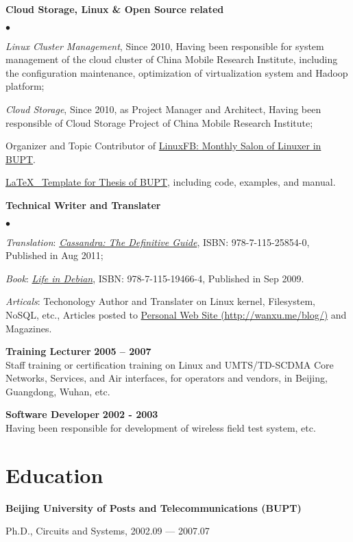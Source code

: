 \documentclass[a4paper,margin,line]{res}
\newenvironment{list1}{
  \begin{list}{\ding{113}}{%
      \setlength{\itemsep}{0in}
      \setlength{\parsep}{0in} \setlength{\parskip}{0in}
      \setlength{\topsep}{0in} \setlength{\partopsep}{0in} 
      \setlength{\leftmargin}{0.17in}}}{\end{list}}
\newenvironment{list2}{
  \begin{list}{$\bullet$}{%
      \setlength{\itemsep}{0in}
      \setlength{\parsep}{0in} \setlength{\parskip}{0in}
      \setlength{\topsep}{0in} \setlength{\partopsep}{0in} 
      \setlength{\leftmargin}{0.2in}}}{\end{list}}
\begin{document}
\begin{resume}
\textbf{Cloud Storage, Linux \& Open Source related}\\
\vspace*{-.1in}
\begin{list2}
\item \textit{Linux Cluster Management}, \enskip Since 2010, Having been responsible for system management of the cloud cluster of China Mobile Research Institute, including the configuration maintenance, optimization of virtualization system and Hadoop platform;
\item \textit{Cloud Storage}, \enskip Since 2010, as Project Manager and Architect, Having been responsible of Cloud Storage Project of China Mobile Research Institute;
\item Organizer and Topic Contributor of \href{http://linuxfb.org}{LinuxFB: Monthly Salon of Linuxer in BUPT}.
\item \href{http://code.google.com/p/latex-bupt}{\LaTeX\mbox{ } Template for Thesis of BUPT}, including code, examples, and manual. 
\end{list2}

\textbf{Technical Writer and Translater}\\
\begin{list2}
\item \textit{Translation}\/: \href{http://wangxu.me/blog/cassandra-the-definitive-guide}{\textit{Cassandra: The Definitive Guide}}\/, ISBN: 978-7-115-25854-0, Published in Aug 2011;
\item \textit{Book}\/: \href{http://wangxu.me/blog/unleashed-debian}{\textit{Life in Debian}}, ISBN: 978-7-115-19466-4, Published in Sep 2009. 
\item \textit{Articals}\/: Techonology Author and Translater on Linux kernel, Filesystem, NoSQL, etc., Articles posted to \href{http://wangxu.me/blog/}{Personal Web Site (http:/$\!$/wanxu.me/blog/)} and Magazines.
\end{list2}

{\bf Training Lecturer} \hfill {\bf 2005 -- 2007}\\
Staff training or certification training on Linux and UMTS/TD-SCDMA Core Networks, Services, and Air interfaces, for operators and vendors, in Beijing, Guangdong, Wuhan, etc.

{\bf Software Developer} \hfill {\bf 2002 - 2003}\\
Having been responsible for development of wireless field test system, etc.

\section{\sc Education}
{\bf Beijing University of Posts and Telecommunications (BUPT)}\\
\vspace*{-.1in}
\begin{list1}
\item[] Ph.D., Circuits and Systems, 2002.09 --- 2007.07
\end{list1}


\end{resume}
\end{document}
